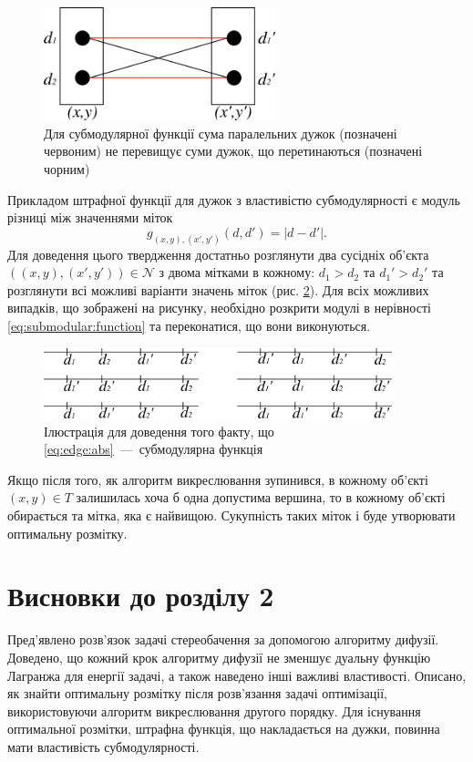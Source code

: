 \begin{figure}[h]
  \centering
  \includegraphics[width=0.6\textwidth]{images/submodular_function}
  \caption{Для субмодулярної функції сума паралельних дужок (позначені червоним)
           не перевищує суми дужок, що перетинаються (позначені чорним)}
  \label{fig:submodular:function}
\end{figure}

Прикладом штрафної функції для дужок з властивістю субмодулярності
є модуль різниці між значеннями міток
\begin{equation} \label{eq:edge:abs}
    g_{\left(x, y \right), \left(x', y' \right)} \left( d, d' \right)
    = \left| d - d' \right|.
\end{equation}
Для доведення цього твердження достатньо розглянути два сусідніх об'єкта
$\left(\left(x, y \right), \left(x', y' \right) \right) \in \mathcal{N}$
з двома мітками в кожному: $d_1 > d_2$ та $d_1' > d_2'$
та розглянути всі можливі варіанти значень міток
(рис. \ref{fig:submodularity:abs:proof}).
Для всіх можливих випадків, що зображені на рисунку,
необхідно розкрити модулі в нерівності \eqref{eq:submodular:function}
та переконатися, що вони виконуються.

\begin{figure}[h]
  \centering
  \includegraphics[width=0.9\textwidth]{images/submodularity_abs_proof}
  \caption{Ілюстрація для доведення того факту,
           що \eqref{eq:edge:abs}~---~субмодулярна функція}
  \label{fig:submodularity:abs:proof}
\end{figure}

Якщо після того, як алгоритм викреслювання зупинився,
в кожному об'єкті $\left(x, y \right) \in T$
залишилась хоча б одна допустима вершина,
то в кожному об'єкті обирається та мітка, яка є найвищою.
Сукупність таких міток і буде утворювати оптимальну розмітку.

\section*{Висновки до розділу 2}

Пред'явлено розв'язок задачі стереобачення за допомогою алгоритму дифузії.
Доведено, що кожний крок алгоритму дифузії не зменшує дуальну функцію Лагранжа
для енергії задачі, а також наведено інші важливі властивості.
Описано, як знайти оптимальну розмітку після розв'язання задачі оптимізації,
використовуючи алгоритм викреслювання другого порядку.
Для існування оптимальної розмітки, штрафна функція, що накладається на дужки,
повинна мати властивість субмодулярності.
